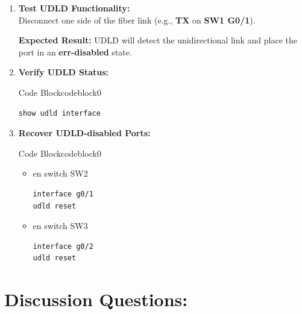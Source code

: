 \documentclass[a4paper]{book}
\begin{document}
\begin{enumerate}
	\item \textbf{Test UDLD Functionality:} \\
	      Disconnect one side of the fiber link (e.g., \textbf{TX} on \textbf{SW1 G0/1}).

	      \textbf{Expected Result:} UDLD will detect the unidirectional link and place the port in an \textbf{err-disabled} state.

	\item \textbf{Verify UDLD Status:}



	      \begin{ocg}{Code Block}{codeblock}{0}
		      \vspace{0.5cm}
		      \begin{lstlisting}
show udld interface
    \end{lstlisting}
	      \end{ocg}

	\item \textbf{Recover UDLD-disabled Ports:}



	      \begin{ocg}{Code Block}{codeblock}{0}
		      \vspace{0.5cm}
		      \begin{itemize}
			      \item en switch SW2
			            \begin{lstlisting}
interface g0/1
udld reset
                \end{lstlisting}
			      \item en switch SW3
			            \begin{lstlisting}
interface g0/2
udld reset
                \end{lstlisting}
		      \end{itemize}
	      \end{ocg}
\end{enumerate}

\section*{Discussion Questions:}
\end{document}
